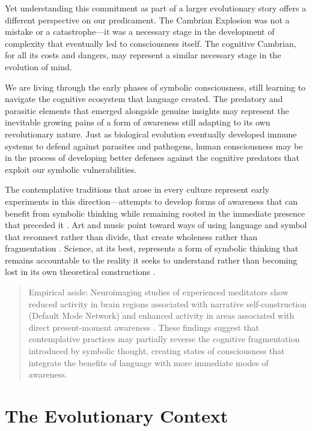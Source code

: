 Yet understanding this commitment as part of a larger evolutionary story offers a different perspective on our predicament. The Cambrian Explosion was not a mistake or a catastrophe—it was a necessary stage in the development of complexity that eventually led to consciousness itself. The cognitive Cambrian, for all its costs and dangers, may represent a similar necessary stage in the evolution of mind.

We are living through the early phases of symbolic consciousness, still learning to navigate the cognitive ecosystem that language created. The predatory and parasitic elements that emerged alongside genuine insights may represent the inevitable growing pains of a form of awareness still adapting to its own revolutionary nature. Just as biological evolution eventually developed immune systems to defend against parasites and pathogens, human consciousness may be in the process of developing better defenses against the cognitive predators that exploit our symbolic vulnerabilities.

The contemplative traditions that arose in every culture represent early experiments in this direction—attempts to develop forms of awareness that can benefit from symbolic thinking while remaining rooted in the immediate presence that preceded it \parencite{tang2015brain}. Art and music point toward ways of using language and symbol that reconnect rather than divide, that create wholeness rather than fragmentation \parencite{dissanayake2015art}. Science, at its best, represents a form of symbolic thinking that remains accountable to the reality it seeks to understand rather than becoming lost in its own theoretical constructions \parencite{polanyi1958personal}.

\begin{quote}\small
Empirical aside: Neuroimaging studies of experienced meditators show reduced activity in brain regions associated with narrative self-construction (Default Mode Network) and enhanced activity in areas associated with direct present-moment awareness \parencite{brewer2011meditation}. These findings suggest that contemplative practices may partially reverse the cognitive fragmentation introduced by symbolic thought, creating states of consciousness that integrate the benefits of language with more immediate modes of awareness.
\end{quote}

\section{The Evolutionary Context}

